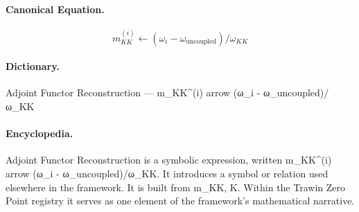 \paragraph{Canonical Equation.}
\[
m_{KK}^{(i)} \leftarrow (\omega_i - \omega_{\text{uncoupled}})/\omega_{KK}
\]

\paragraph{Dictionary.}
Adjoint Functor Reconstruction — m\_KK\textasciicircum{}(i) arrow (ω\_i - ω\_uncoupled)/ω\_KK

\paragraph{Encyclopedia.}
Adjoint Functor Reconstruction is a symbolic expression, written m\_KK\textasciicircum{}(i) arrow (ω\_i - ω\_uncoupled)/ω\_KK. It introduces a symbol or relation used elsewhere in the framework. It is built from m\_KK, K. Within the Trawin Zero Point registry it serves as one element of the framework's mathematical narrative.
